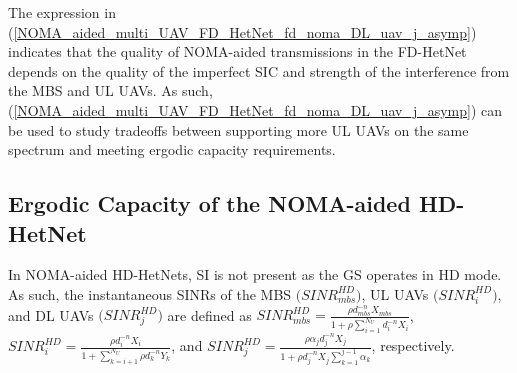 The expression in (\ref{NOMA_aided_multi_UAV_FD_HetNet_fd_noma_DL_uav_j_asymp}) indicates that the quality of NOMA-aided transmissions in the FD-HetNet depends on the quality of the imperfect SIC and strength of the interference from the MBS and UL UAVs. As such, (\ref{NOMA_aided_multi_UAV_FD_HetNet_fd_noma_DL_uav_j_asymp}) can be used to study tradeoffs between supporting more UL UAVs on the same spectrum and meeting ergodic capacity requirements.

\subsection{Ergodic Capacity of the NOMA-aided HD-HetNet}

In NOMA-aided HD-HetNets, SI is not present as the GS operates in HD mode. As such, the instantaneous SINRs of the MBS $\Big(SINR_{mbs}^{HD}\Big)$, UL UAVs $\Big(SINR_{i}^{HD}\Big)$, and DL UAVs $\Big(SINR_{j}^{HD}\Big)$ are defined as $SINR_{mbs}^{HD} = \frac{ \rho  d_{mbs}^{-n} X_{mbs}}{1 + \rho \sum_{i=1}^{N_U} d_i^{-n} X_{i}}$, $SINR_{i}^{HD} = \frac{ \rho  d_{i}^{-n} X_i}{1 + \sum_{k=i+1}^{N_U} \rho  d_k^{-n} Y_k}$, and $SINR_j^{HD} = \frac{\rho  \alpha_j d_j^{-n} X_j}{1 + \rho  d_j^{-n} X_j \sum_{k=1}^{j-1}\alpha_k}$, respectively.


